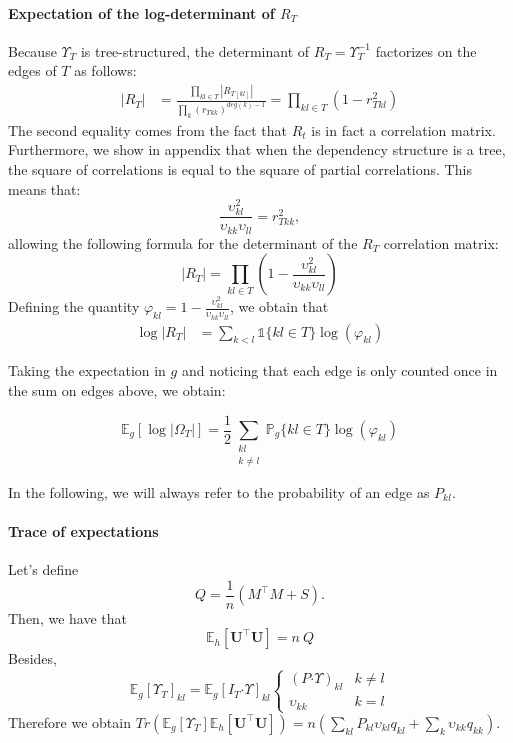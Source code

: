 \documentclass[11pt,a4paper]{article}
\newcommand{\Ubf}{\boldsymbol{U}}
\newcommand{\Esp}{\mathds{E}}
\newcommand{\had}{\boldsymbol{\cdot}}
\begin{document}
\paragraph{Expectation of the log-determinant of $R_T$\\}
Because $\Upsilon_T$ is tree-structured, the determinant of $R_T=\Upsilon_T^{-1}$ factorizes on the edges of $T$ as follows:
\begin{align*}
|R_T| &=\frac{ \prod_{kl \in T} |R_{T[kl]}|}{\prod_k (r_{Tkk})^{deg(k)-1}} =  \prod_{kl \in T} (1-r_{Tkl}^2)
 \end{align*}
 The second equality comes from the fact that $R_t$ is in fact a correlation matrix. Furthermore, we show in appendix that when the dependency structure is a tree, the square of correlations is equal to the square of partial correlations. This means that:
 $$\frac{\upsilon_{kl}^2}{\upsilon_{kk}\upsilon_{ll}} = r_{Tkk}^2,$$ allowing the following formula for the determinant of the $R_T$ correlation matrix:
 $$ |R_T| = \prod_{kl\in T} (1 - \frac{\upsilon_{kl}^2}{\upsilon_{kk}\upsilon_{ll}})$$
Defining the quantity $\varphi_{kl} = 1- \frac{\upsilon_{kl}^2}{\upsilon_{kk}\upsilon_{ll}}$, we obtain that
 \begin{align*}
\log |R_{T}|&=   \sum _{k<l} \mathds{1}\{kl \in T\}  \log(\varphi_{kl}) 
\end{align*}

Taking the expectation in $g$ and noticing that each edge is only counted once in the sum on edges above, we obtain:

$$\Esp_g[\log |\Omega_{T}|]= \frac{1}{2}\sum _{\substack{kl\\ k \neq l}} \mathds{P}_g\{kl \in T \}\log (\varphi_{kl}) $$ 

In the following, we will always refer to the probability of an edge as $P_{kl}$.

\paragraph{Trace of expectations\\}
Let's define $$Q=\frac{1}{n} (M^\intercal M + S).$$
Then, we have that $$ \Esp_h[\Ubf^\intercal \Ubf] = n\:Q$$
Besides, \[ \Esp_g[\Upsilon_T]_{kl}  =  \Esp_g[I_T\had\Upsilon]_{kl} \left\{ 
\begin{array}{cc}
(P \had \Upsilon)_{kl} & k \neq l\\
\upsilon_{kk} & k = l
\end{array}
\right.
\]
Therefore we obtain $Tr(\Esp_g[\Upsilon_T] \Esp_h[\Ubf^\intercal \Ubf]) = n (\sum_{kl} P_{kl} \upsilon_{kl} q_{kl} + \sum_k \upsilon_{kk} q_{kk})$.\\
\end{document}
